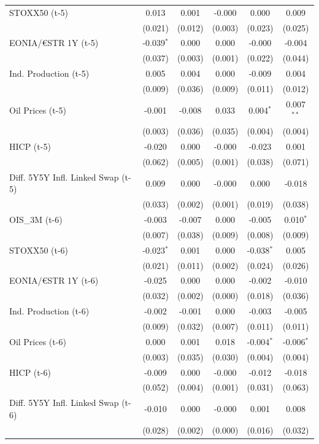 \begin{longtable}[t]{lccccc}
STOXX50 (t-5) & 0.013 & 0.001 & -0.000 & 0.000 & 0.009\\
 & (0.021) & (0.012) & (0.003) & (0.023) & (0.025)\\
EONIA/€STR 1Y (t-5) & -0.039$^{*}$ & 0.000 & 0.000 & -0.000 & -0.004\\
 & (0.037) & (0.003) & (0.001) & (0.022) & (0.044)\\
Ind. Production (t-5) & 0.005 & 0.004 & 0.000 & -0.009 & 0.004\\
 & (0.009) & (0.036) & (0.009) & (0.011) & (0.012)\\
Oil Prices (t-5) & -0.001 & -0.008 & 0.033 & 0.004$^{*}$ & 0.007$^{**}$\\
 & (0.003) & (0.036) & (0.035) & (0.004) & (0.004)\\
HICP (t-5) & -0.020 & 0.000 & -0.000 & -0.023 & 0.001\\
 & (0.062) & (0.005) & (0.001) & (0.038) & (0.071)\\
Diff. 5Y5Y Infl. Linked Swap (t-5) & 0.009 & 0.000 & -0.000 & 0.000 & -0.018\\
 & (0.033) & (0.002) & (0.001) & (0.019) & \vphantom{1} (0.038)\\
OIS\_3M (t-6) & -0.003 & -0.007 & 0.000 & -0.005 & 0.010$^{*}$\\
 & (0.007) & (0.038) & (0.009) & (0.008) & (0.009)\\
STOXX50 (t-6) & -0.023$^{*}$ & 0.001 & 0.000 & -0.038$^{*}$ & 0.005\\
 & (0.021) & (0.011) & (0.002) & (0.024) & (0.026)\\
EONIA/€STR 1Y (t-6) & -0.025 & 0.000 & 0.000 & -0.002 & -0.010\\
 & (0.032) & (0.002) & (0.000) & (0.018) & (0.036)\\
Ind. Production (t-6) & -0.002 & -0.001 & 0.000 & -0.003 & -0.005\\
 & (0.009) & (0.032) & (0.007) & (0.011) & (0.011)\\
Oil Prices (t-6) & 0.000 & 0.001 & 0.018 & -0.004$^{*}$ & -0.006$^{*}$\\
 & (0.003) & (0.035) & (0.030) & (0.004) & (0.004)\\
HICP (t-6) & -0.009 & 0.000 & -0.000 & -0.012 & -0.018\\
 & (0.052) & (0.004) & (0.001) & (0.031) & (0.063)\\
Diff. 5Y5Y Infl. Linked Swap (t-6) & -0.010 & 0.000 & -0.000 & 0.001 & 0.008\\
 & (0.028) & (0.002) & (0.000) & (0.016) & (0.032)\\

\end{longtable}
